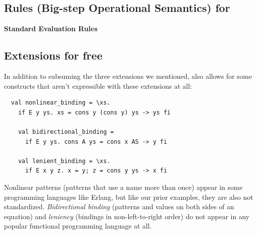 \documentclass[runningheads]{llncs}
\begin{document}




    
    \vfilbreak
    
    \subsection{Rules (Big-step Operational Semantics) for~\VMinus}

    \label{vmsemantics}
    \label{usemantics1}

    \scriptsize
    {\vmsemantics

    \noindent \textbf{Standard Evaluation Rules}
    
    \usemantics 
    }
    


\normalsize

\subsection{Extensions for free}
\label{freeextensions}

In addition to subsuming the three extensions we mentioned, \VMinus also allows
for some constructs that aren't expressible with these extensions at all: 

\begingroup\scriptsize
\begin{verbatim}
  val nonlinear_binding = \xs. 
    if E y ys. xs = cons y (cons y) ys -> ys fi 

    val bidirectional_binding = 
      if E y ys. cons A ys = cons x AS -> y fi 

    val lenient_binding = \xs.
      if E x y z. x = y; z = cons y ys -> x fi 
\end{verbatim}
\par
\endgroup %


    
Nonlinear patterns (patterns that use a name more than once) appear in some
programming languages like Erlang, but like our prior examples, they are also
not standardized. %
\textit{Bidirectional binding} (patterns and values on both sides of an
equation) and \textit{leniency} (bindings in non-left-to-right order) do not
appear in any popular functional programming language at all. %
\end{document}
